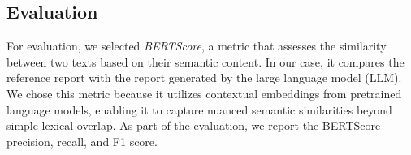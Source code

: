 \documentclass[fleqn,moreauthors,10pt]{ds_report}
\begin{document}
\subsection*{Evaluation}

For evaluation, we selected \textit{BERTScore}, a metric that assesses the similarity between two texts based on their semantic content. In our case, it compares the reference report with the report generated by the large language model (LLM). We chose this metric because it utilizes contextual embeddings from pretrained language models, enabling it to capture nuanced semantic similarities beyond simple lexical overlap. As part of the evaluation, we report the BERTScore precision, recall, and F1 score.



\end{document}
